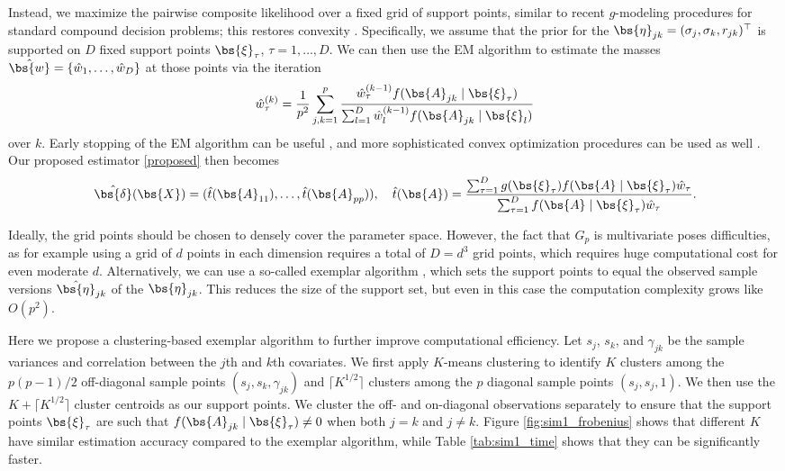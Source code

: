 Instead, we maximize the pairwise composite likelihood over a fixed grid of support points, similar to recent $g$-modeling procedures for standard compound decision problems; this restores convexity \citep{jiang2009general, koenker2014convex, feng2018approximate}. Specifically, we assume that the prior for the $\bs{\eta}_{jk} = (\sigma_j, \sigma_k, r_{jk})^\top$ is supported on $D$ fixed support points $\bs{\xi}_{\tau}$, $\tau=1,\ldots, D$. We can then use the EM algorithm to estimate the masses $\hat{\bs{w}}=\{\hat{w}_{1},\ldots, \hat{w}_{D}\}$ at those points via the iteration
\[
\hat{w}_{\tau}^{(k)} = \frac{1}{p^2}\sum_{j, k = 1}^p \frac{\hat{w}_{\tau}^{(k-1)} f(\bs{A}_{jk} \mid \bs{\xi}_{\tau})}{\sum_{l=1}^D\hat{w}_l^{(k-1)} f(\bs{A}_{jk} \mid \bs{\xi}_l)}
\]
over $k$. Early stopping of the EM algorithm can be useful \citep{koenker2019comment}, and more sophisticated convex optimization procedures can be used as well \citep{koenker2014convex}. Our proposed estimator \eqref{proposed} then becomes
\[
\hat{\bs{\delta}}(\bs{X})
=
(\hat{t}(\bs{A}_{11}), \ldots, \hat{t}(\bs{A}_{pp})),
\quad
\hat{t}(\bs{A}) = \frac{ \sum_{\tau=1}^D g(\bs{\xi}_\tau) f(\bs{A} \mid \bs{\xi}_\tau) \hat{w}_{\tau}}{ \sum_{\tau=1}^D f(\bs{A} \mid \bs{\xi}_\tau) \hat{w}_{\tau}}.
\]

Ideally, the grid points should be chosen to densely cover the parameter space. However, the fact that $G_p$ is multivariate poses difficulties, as for example using a grid of $d$ points in each dimension requires a total of $D = d^3$ grid points, which requires huge computational cost for even moderate $d$. Alternatively, we can use a so-called exemplar algorithm \citep{saha2020nonparametric}, which sets the support points to equal the observed sample versions $\hat{\bs{\eta}}_{jk}$ of the $\bs{\eta}_{jk}$. This reduces the size of the support set, but even in this case the computation complexity grows like $O(p^2)$.

Here we propose a clustering-based exemplar algorithm to further improve computational efficiency. Let $s_j$, $s_k$, and $\gamma_{jk}$ be the sample variances and correlation between the $j$th and $k$th covariates. We first apply $K$-means clustering to identify $K$ clusters among the $p (p-1) / 2$ off-diagonal sample points $(s_j,s_k,\gamma_{jk})$ and $\lceil{K^{1/2}}\rceil$ clusters among the $p$ diagonal sample points $(s_j,s_j,1)$. We then use the $K+\lceil{K^{1/2}}\rceil$ cluster centroids as our support points. We cluster the off- and on-diagonal observations separately to ensure that the support points $\bs{\xi}_\tau$ are such that $f(\bs{A}_{jk} \mid \bs{\xi}_\tau) \ne 0$ when both $j = k$ and $j \ne k$. Figure \ref{fig:sim1_frobenius} shows that different $K$ have similar estimation accuracy compared to the exemplar algorithm, while Table \ref{tab:sim1_time} shows that they can be significantly faster.

